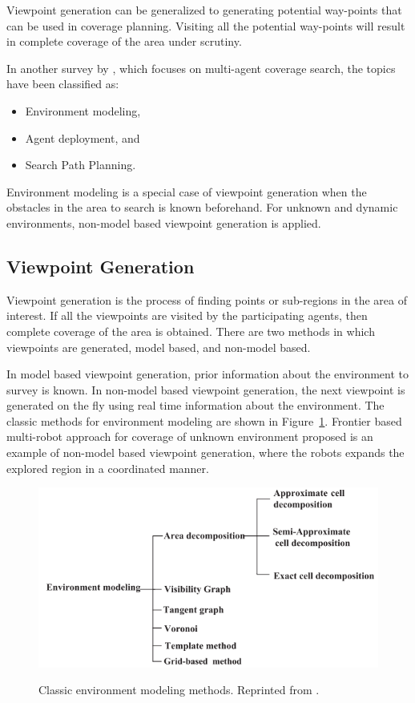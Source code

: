 Viewpoint generation can be generalized to generating potential way-points that can be used in coverage planning. Visiting all the  potential way-points will result in complete coverage of the area under scrutiny.

In another survey by , which focuses on multi-agent coverage search, the topics have been classified as:
\begin{itemize}
	\item Environment modeling,
	\item Agent deployment, and
	\item Search Path Planning.
\end{itemize}

Environment modeling is a special case of viewpoint generation when the obstacles in the area to search is known beforehand. For unknown and dynamic environments, non-model based viewpoint generation is applied.

\subsection{Viewpoint Generation}

Viewpoint generation is the process of finding points or sub-regions in the area of interest. If all the viewpoints are visited by the participating agents, then complete coverage of the area is obtained. There are two methods in which viewpoints are generated, model based, and non-model based.

In model based viewpoint generation, prior information about the environment to survey is known. In non-model based viewpoint generation, the next viewpoint is generated on the fly using real time information about the environment. The classic methods for environment modeling are shown in Figure~\ref{fig:environment-modelling}. Frontier based multi-robot approach for coverage of unknown environment proposed  is an example of non-model based viewpoint generation, where the robots expands the explored region in a coordinated manner.

\begin{figure}
	\centering
	\caption[Classic environment modeling methods.]{\small Classic environment modeling methods. Reprinted from .}
	\includegraphics[width=5in]{figures/literature/environment-modelling}
	\label{fig:environment-modelling}
\end{figure}

